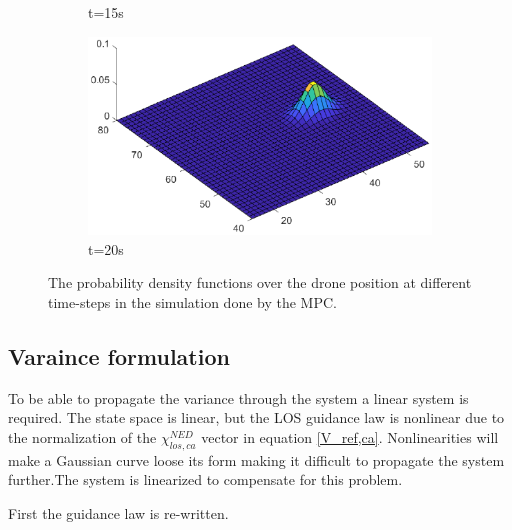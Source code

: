 \begin{figure}[t]
\begin{subfigure}{.5\textwidth}
    \caption{t=15s}
    \label{fig:PDF_t15}
    \end{subfigure}%
    \begin{subfigure}{0.5\textwidth}
        \centering
    \includegraphics[width=\linewidth]{Figures/PDF_t20}
    \caption{t=20s}
    \label{fig:PDF_t20}
    \end{subfigure} 
    \caption{The probability density functions over the drone position at different time-steps in the simulation done by the MPC.}
    \label{fig:PDF_development}
\end{figure}

\subsection{Varaince formulation}

To be able to propagate the variance through the system a linear system is required. The state space is linear, but the LOS guidance law is nonlinear due to the normalization of the $\chi^{NED}_{los,ca}$ vector in equation \eqref{V_ref,ca}. Nonlinearities will make a Gaussian curve loose its form making it difficult to propagate the system further.The system is linearized to compensate for this problem.

First the guidance law is re-written.

